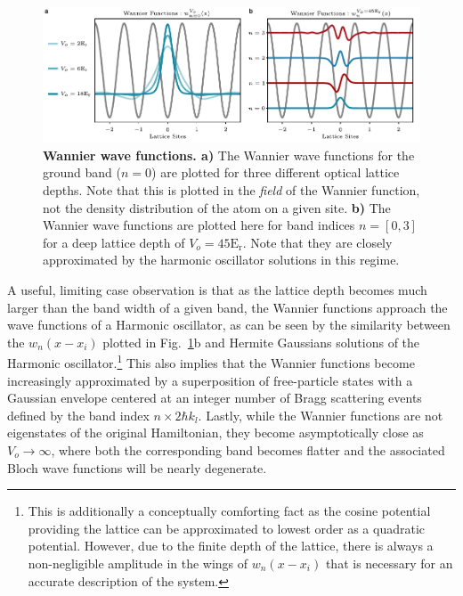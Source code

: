 \begin{figure}[t!]
		\includegraphics[width=\columnwidth]{figures/ch1/BHParams/WannierFx_v2edit.pdf} 
		\caption{\textbf{Wannier wave functions. a)} The Wannier wave functions for the ground band ($n=0$) are plotted for three different optical lattice depths. Note that this is plotted in the \emph{field} of the Wannier function, not the density distribution of the atom on a given site. \textbf{b)} The Wannier wave functions are plotted here for band indices $n=[0,3]$ for a deep lattice depth of $V_o=45 \mathrm{E_r}$. Note that they are closely approximated by the harmonic oscillator solutions in this regime.}
		\label{fig:wFx}	
\end{figure}


A useful, limiting case observation is that as the lattice depth becomes much larger than the band width of a given band, the Wannier functions approach the wave functions of a Harmonic oscillator, as can be seen by the similarity between the $w_n(x-x_i)$ plotted in Fig.~\ref{fig:wFx}b and Hermite Gaussians solutions of the Harmonic oscillator.\footnote{This is additionally a conceptually comforting fact as the cosine potential providing the lattice can be approximated to lowest order as a quadratic potential. However, due to the finite depth of the lattice, there is always a non-negligible amplitude in the wings of $w_n(x-x_i)$ that is necessary for an accurate description of the system.} This also implies that the Wannier functions become increasingly approximated by a superposition of free-particle states with a Gaussian envelope centered at an integer number of Bragg scattering events defined by the band index $n \times 2 \hbar k_l$. Lastly, while the Wannier functions are not eigenstates of the original Hamiltonian, they become asymptotically close as $V_o \rightarrow \infty$, where both the corresponding band becomes flatter and the associated Bloch wave functions will be nearly degenerate.


